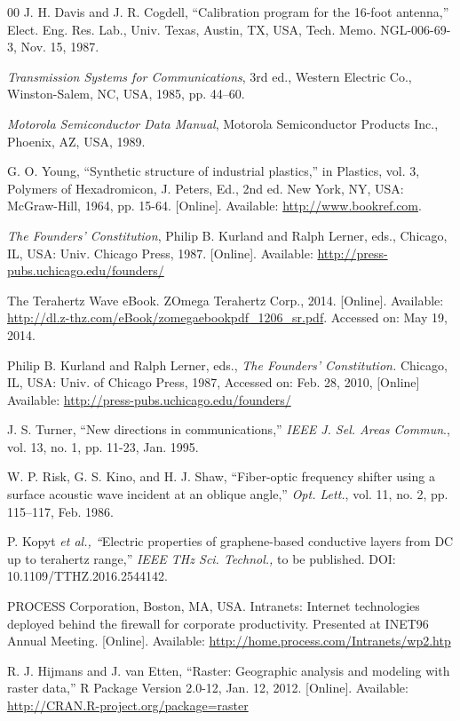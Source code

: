 \documentclass{ieeeaccess}
\begin{document}
\begin{thebibliography}{00}
 J. H. Davis and J. R. Cogdell, ``Calibration program for the 16-foot antenna,'' Elect. Eng. Res. Lab., Univ. Texas, Austin, TX, USA, Tech. Memo. NGL-006-69-3, Nov. 15, 1987.

 \emph{Transmission Systems for Communications}, 3rd ed., Western Electric Co., Winston-Salem, NC, USA, 1985, pp. 44--60.

 \emph{Motorola Semiconductor Data Manual}, Motorola Semiconductor Products Inc., Phoenix, AZ, USA, 1989.

 G. O. Young, ``Synthetic structure of industrial plastics,'' in Plastics, vol. 3, Polymers of Hexadromicon, J. Peters, Ed., 2nd ed. New York, NY, USA: McGraw-Hill, 1964, pp. 15-64. [Online]. Available: \underline{http://www.bookref.com}.

 \emph{The Founders' Constitution}, Philip B. Kurland and Ralph Lerner, eds., Chicago, IL, USA: Univ. Chicago Press, 1987. [Online]. Available: \underline{http://press-pubs.uchicago.edu/founders/}

 The Terahertz Wave eBook. ZOmega Terahertz Corp., 2014. [Online]. Available: \underline{http://dl.z-thz.com/eBook/zomegaebookpdf\_1206\_sr.pdf}. Accessed on: May 19, 2014.

 Philip B. Kurland and Ralph Lerner, eds., \emph{The Founders' Constitution.} Chicago, IL, USA: Univ. of Chicago Press, 1987, Accessed on: Feb. 28, 2010, [Online] Available: \underline{http://press-pubs.uchicago.edu/founders/}

 J. S. Turner, ``New directions in communications,'' \emph{IEEE J. Sel. Areas Commun}., vol. 13, no. 1, pp. 11-23, Jan. 1995.

 W. P. Risk, G. S. Kino, and H. J. Shaw, ``Fiber-optic frequency shifter using a surface acoustic wave incident at an oblique angle,'' \emph{Opt. Lett.}, vol. 11, no. 2, pp. 115--117, Feb. 1986.

 P. Kopyt \emph{et al., ``}Electric properties of graphene-based conductive layers from DC up to terahertz range,'' \emph{IEEE THz Sci. Technol.,} to be published. DOI: 10.1109/TTHZ.2016.2544142.

 PROCESS Corporation, Boston, MA, USA. Intranets: Internet technologies deployed behind the firewall for corporate productivity. Presented at INET96 Annual Meeting. [Online]. Available: \underline{http://home.process.com/Intranets/wp2.htp}

 R. J. Hijmans and J. van Etten, ``Raster: Geographic analysis and modeling with raster data,'' R Package Version 2.0-12, Jan. 12, 2012. [Online]. Available: \underline{http://CRAN.R-project.org/package=raster}


\end{thebibliography}
\end{document}

